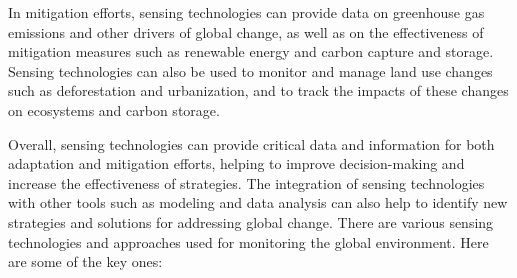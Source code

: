 In mitigation efforts, sensing technologies can provide data on greenhouse gas emissions and other drivers of global change, as well as on the effectiveness of mitigation measures such as renewable energy and carbon capture and storage. Sensing technologies can also be used to monitor and manage land use changes such as deforestation and urbanization, and to track the impacts of these changes on ecosystems and carbon storage.

Overall, sensing technologies can provide critical data and information for both adaptation and mitigation efforts, helping to improve decision-making and increase the effectiveness of strategies. The integration of sensing technologies with other tools such as modeling and data analysis can also help to identify new strategies and solutions for addressing global change. There are various sensing technologies and approaches used for monitoring the global environment. Here are some of the key ones:
